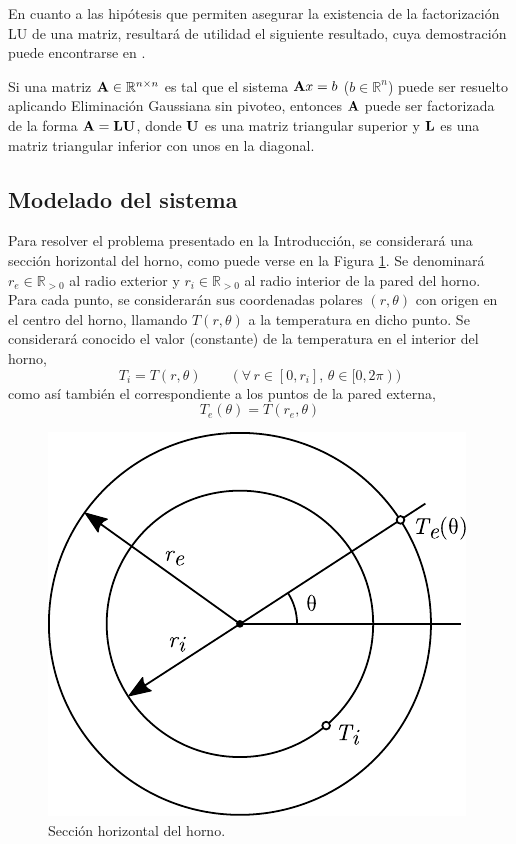             En cuanto a las hipótesis que permiten asegurar la existencia de la factorización LU de una matriz, resultará de utilidad el siguiente resultado, cuya demostración puede encontrarse en \cite[p.~403]{burden}.

            \begin{prop} \label{prop:EG sin pivoteo implica LU}
                Si una matriz $\mathbf{A} \in \mathbb{R}^{n \times n}$ es tal que el sistema $\mathbf{A}x=b$ ($b \in \mathbb{R}^{n}$) puede ser resuelto aplicando Eliminación Gaussiana sin pivoteo, entonces $\mathbf{A}$ puede ser factorizada de la forma $\mathbf{A}=\mathbf{L}\mathbf{U}$, donde $\mathbf{U}$ es una matriz triangular superior y $\mathbf{L}$ es una matriz triangular inferior con unos en la diagonal.
            \end{prop}

    \subsection{Modelado del sistema}

        Para resolver el problema presentado en la Introducción, se considerará una sección horizontal del horno, como puede verse en la Figura \ref{fig:seccion-horno}. Se denominará $r_e \in \mathbb{R}_{>0}$ al radio exterior y $r_i \in \mathbb{R}_{>0}$ al radio interior de la pared del horno. Para cada punto, se considerarán sus coordenadas polares $(r, \theta)$ con origen en el centro del horno, llamando $T(r, \theta)$ a la temperatura en dicho punto. Se considerará conocido el valor (constante) de la temperatura en el interior del horno, \[ T_i = T(r, \theta) \qquad (\forall \, r \in [0, r_i], \, \theta \in [0, 2 \pi)) \] como así también el correspondiente a los puntos de la pared externa, \[ T_e(\theta) = T(r_e, \theta) \]

        \begin{figure}[h]
          \centering

          \includegraphics{imagenes/seccion-horno.pdf}

          \caption{Sección horizontal del horno.}
          \label{fig:seccion-horno}
        \end{figure}

